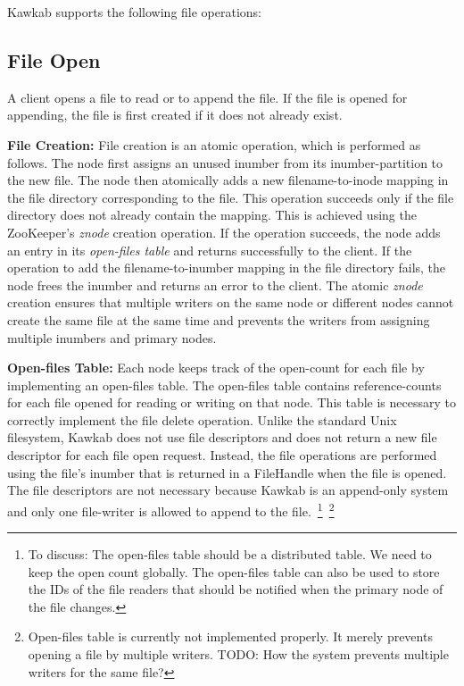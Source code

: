 \documentclass[]{article}
\newcommand{\subtopic}[1]{\vspace{1.5pt} \noindent \textbf{#1}}
\newcommand{\hl}[1]{\textcolor{hlcolor}{#1}}
\begin{document}
Kawkab supports the following file operations:

\subsection{File Open}

A client opens a file to read or to append the file. If the file is opened for
appending, the file is first created if it does not already exist.

\subtopic{File Creation:} File creation is an atomic operation, which is
performed as follows.
The node first assigns an unused inumber from its inumber-partition to the new
file.  The node then atomically adds a new filename-to-inode mapping in the
file directory corresponding to the file. This operation succeeds only if the
file directory does not already contain the mapping. This is achieved using the
ZooKeeper's \textit{znode} creation operation.  If the operation succeeds, the
node adds an entry in its \textit{open-files table} and returns successfully to
the client.  If the operation to add the filename-to-inumber mapping in the
file directory fails, the node frees the inumber and returns an error to the
client.  The atomic \textit{znode} creation ensures that multiple writers on
the same node or different nodes cannot create the same file at the same time
and prevents the writers from assigning multiple inumbers and primary nodes.


\subtopic{Open-files Table:} Each node keeps track of the open-count for each
file by implementing an open-files table.  The open-files table contains
reference-counts for each file opened for reading or writing on that node.
This table is necessary to correctly implement the file delete operation.
Unlike the standard Unix filesystem, Kawkab does not use file descriptors and
does not return a new file descriptor for each file open request.  Instead, the
file operations are performed using the file's inumber that is returned in a
FileHandle when the file is opened.  The file descriptors are not necessary
because Kawkab is an append-only system and only one file-writer is allowed to
append to the file.~\footnote{\hl{To discuss: The open-files table should be a
distributed table. We need to keep the open count globally. The open-files
table can also be used to store the IDs of the file readers that should be
notified when the primary node of the file changes.}}~\footnote{Open-files
table is currently not implemented properly. It merely prevents opening
a file by multiple writers. TODO: How the system prevents multiple writers
for the same file?}
\end{document}
